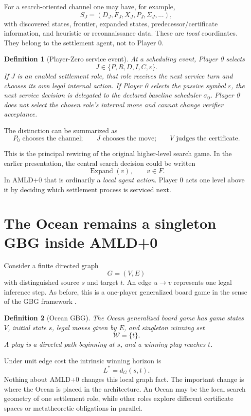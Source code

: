 \documentclass[11pt]{article}
\newtheorem{definition}{Definition}[section]
\newcommand{\Wset}{\mathcal{W}}
\begin{document}
For a search-oriented channel one may have, for example,
\[
S_J=(D_J,F_J,X_J,P_J,\Sigma_J,\ldots),
\]
with discovered states, frontier, expanded states, predecessor/certificate
information, and heuristic or reconnaissance data.  These are \emph{local}
coordinates.  They belong to the settlement agent, not to Player 0.

\begin{definition}[Player-Zero service event]
At a scheduling event, Player 0 selects
\[
J\in\{P,R,D,I,C,\varepsilon\}.
\]
If $J$ is an enabled settlement role, that role receives the next service turn
and chooses its own legal internal action.  If Player 0 selects the passive
symbol $\varepsilon$, the next service decision is delegated to the declared
baseline scheduler $\sigma_0$.  Player 0 does not select the chosen role's
internal move and cannot change verifier acceptance.
\end{definition}

The distinction can be summarized as
\[
\boxed{
P_0\text{ chooses the channel;}\qquad
J\text{ chooses the move;}\qquad
V\text{ judges the certificate.}
}
\]

This is the principal rewiring of the original higher-level search game.  In
the earlier presentation, the central search decision could be written
\[
\operatorname{Expand}(v),\qquad v\in F.
\]
In AMLD+0 that is ordinarily a \emph{local agent action}.  Player 0 acts one
level above it by deciding which settlement process is serviced next.

\section{The Ocean remains a singleton GBG inside AMLD+0}

Consider a finite directed graph
\[
G=(V,E)
\]
with distinguished source $s$ and target $t$.  An edge $u\to v$ represents one
legal inference step.  As before, this is a one-player generalized board game
in the sense of the GBG framework \cite{tenneson-gbg}.

\begin{definition}[Ocean GBG]
The Ocean generalized board game has game states $V$, initial state $s$, legal
moves given by $E$, and singleton winning set
\[
\Wset=\{t\}.
\]
A play is a directed path beginning at $s$, and a winning play reaches $t$.
\end{definition}

Under unit edge cost the intrinsic winning horizon is
\[
L^*=d_G(s,t).
\]
Nothing about AMLD+0 changes this local graph fact.  The important change is
where the Ocean is placed in the architecture.  An Ocean may be the local
search geometry of one settlement role, while other roles explore different
certificate spaces or metatheoretic obligations in parallel.
\end{document}
